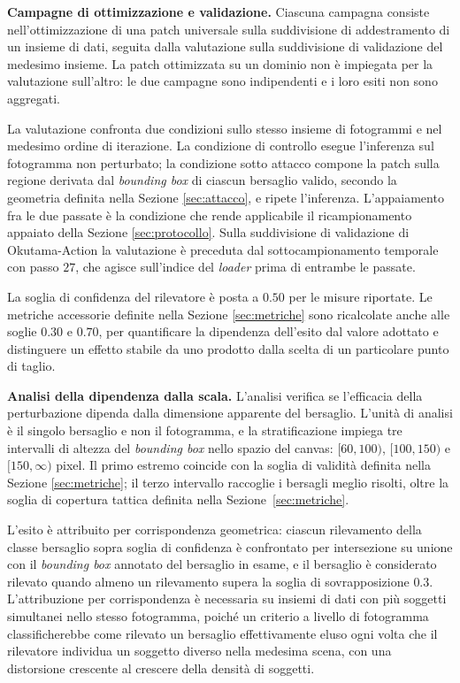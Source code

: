 \documentclass[a4paper,12pt]{report}
\begin{document}
\textbf{Campagne di ottimizzazione e validazione.}
\label{sec:campagne}
Ciascuna campagna consiste nell'ottimizzazione di una patch universale sulla
suddivisione di addestramento di un insieme di dati, seguita dalla valutazione
sulla suddivisione di validazione del medesimo insieme. La patch ottimizzata su
un dominio non è impiegata per la valutazione sull'altro: le due campagne sono
indipendenti e i loro esiti non sono aggregati.

La valutazione confronta due condizioni sullo stesso insieme di fotogrammi e nel
medesimo ordine di iterazione. La condizione di controllo esegue l'inferenza sul
fotogramma non perturbato; la condizione sotto attacco compone la patch sulla
regione derivata dal \textit{bounding box} di ciascun bersaglio valido, secondo
la geometria definita nella Sezione \ref{sec:attacco}, e ripete l'inferenza.
L'appaiamento fra le due passate è la condizione che rende applicabile il
ricampionamento appaiato della Sezione \ref{sec:protocollo}. Sulla suddivisione
di validazione di Okutama-Action la valutazione è preceduta dal
sottocampionamento temporale con passo $27$, che agisce sull'indice del
\textit{loader} prima di entrambe le passate.

La soglia di confidenza del rilevatore è posta a $0.50$ per le misure riportate.
Le metriche accessorie definite nella Sezione \ref{sec:metriche} sono
ricalcolate anche alle soglie $0.30$ e $0.70$, per quantificare la dipendenza
dell'esito dal valore adottato e distinguere un effetto stabile da uno prodotto
dalla scelta di un particolare punto di taglio.

\textbf{Analisi della dipendenza dalla scala.}
\label{sec:stratificazione}
L'analisi verifica se l'efficacia della perturbazione dipenda dalla dimensione
apparente del bersaglio. L'unità di analisi è il singolo bersaglio e non il
fotogramma, e la stratificazione impiega tre intervalli di altezza del
\textit{bounding box} nello spazio del canvas: $[60, 100)$, $[100, 150)$ e
$[150, \infty)$ pixel. Il primo estremo coincide con la soglia di validità
definita nella Sezione \ref{sec:metriche}; il terzo intervallo raccoglie i bersagli meglio risolti, oltre la
soglia di copertura tattica definita nella Sezione~\ref{sec:metriche}.

L'esito è attribuito per corrispondenza geometrica: ciascun rilevamento della
classe bersaglio sopra soglia di confidenza è confrontato per intersezione su
unione con il \textit{bounding box} annotato del bersaglio in esame, e il
bersaglio è considerato rilevato quando almeno un rilevamento supera la soglia
di sovrapposizione $0.3$. L'attribuzione per corrispondenza è necessaria su
insiemi di dati con più soggetti simultanei nello stesso fotogramma, poiché un
criterio a livello di fotogramma classificherebbe come rilevato un bersaglio
effettivamente eluso ogni volta che il rilevatore individua un soggetto diverso
nella medesima scena, con una distorsione crescente al crescere della densità di
soggetti.
\end{document}
